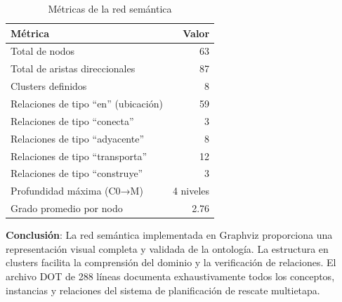 \documentclass[conference]{IEEEtran}
\begin{document}
    \begin{table}[H]
    \caption{Métricas de la red semántica}
    \label{tab:metricas_red}
    \centering
    \small
    \begin{tabular}{@{}lr@{}}
    \toprule
    \textbf{Métrica} & \textbf{Valor} \\
    \midrule
    Total de nodos & 63 \\
    Total de aristas direccionales & 87 \\
    Clusters definidos & 8 \\
    Relaciones de tipo ``en'' (ubicación) & 59 \\
    Relaciones de tipo ``conecta'' & 3 \\
    Relaciones de tipo ``adyacente'' & 8 \\
    Relaciones de tipo ``transporta'' & 12 \\
    Relaciones de tipo ``construye'' & 3 \\
    Profundidad máxima (C0→M) & 4 niveles \\
    Grado promedio por nodo & 2.76 \\
    \bottomrule
    \end{tabular}
    \end{table}

    \textbf{Conclusión}: La red semántica implementada en Graphviz proporciona una representación visual completa y validada de la ontología. La estructura en clusters facilita la comprensión del dominio y la verificación de relaciones. El archivo DOT de 288 líneas documenta exhaustivamente todos los conceptos, instancias y relaciones del sistema de planificación de rescate multietapa.
\end{document}
